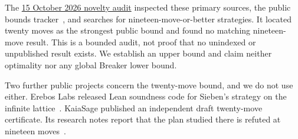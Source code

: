\documentclass[11pt]{amsart}
\newcommand{\artifact}[2]{\href{https://github.com/shjvandekamp/math/blob/main/topics/snaky/#1}{#2}}
\begin{document}
The \artifact{NOVELTY.md}{15 October 2026 novelty audit} inspected these
primary sources, the public bounds tracker~\cite{Tracker}, and searches for
nineteen-move-or-better strategies. It located twenty moves as the strongest
public bound and found no matching nineteen-move result. This is a bounded
audit, not proof that no unindexed or unpublished result exists. We establish
an upper bound and claim neither optimality nor any global Breaker lower bound.

Two further public projects concern the twenty-move bound, and we do not use
either. Erebos Labs released Lean soundness code for Sieben's strategy on the
infinite lattice~\cite{Erebos}. KaiaSage published an independent draft
twenty-move certificate. Its research notes report that the plan studied there
is refuted at nineteen moves~\cite{KaiaSage}.
\end{document}
